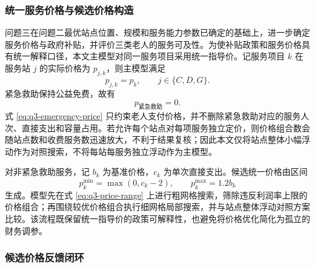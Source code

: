 \subsubsection{统一服务价格与候选价格构造}

问题三在问题二最优站点位置、规模和服务能力参数已确定的基础上，进一步确定服务价格与政府补贴，并评价三类老人的服务可及性。为使补贴政策和服务价格具有统一解释口径，本文主模型对同一服务项目采用统一指导价。记服务项目 $k$ 在服务站 $j$ 的实际价格为 $p_{j,k}$，则主模型满足
\begin{equation}
  p_{j,k}=p_k,
  \qquad j\in\{C,D,G\}.
  \label{eq:q3-uniform-price}
\end{equation}
紧急救助保持公益免费，故有
\begin{equation}
  p_{\text{紧急救助}}=0.
  \label{eq:q3-emergency-price}
\end{equation}
式 \eqref{eq:q3-emergency-price} 只约束老人支付价格，并不删除紧急救助对应的服务人次、直接支出和容量占用。若允许每个站点对每项服务独立定价，则价格组合数会随站点数和收费服务数迅速放大，不利于结果复核；因此本文仅将站点整体小幅浮动作为对照搜索，不将每站每服务独立浮动作为主模型。

对非紧急救助服务，记 $b_k$ 为基准价格，$c_k$ 为单次直接支出。候选统一价格由区间
\begin{equation}
  p_k^{\min}=\max(0,c_k-2),
  \qquad
  p_k^{\max}=1.2b_k
  \label{eq:q3-price-range}
\end{equation}
生成。模型先在式 \eqref{eq:q3-price-range} 上进行粗网格搜索，筛除违反利润率上限的价格组合；再围绕较优价格组合执行细网格局部搜索，并与站点整体浮动对照方案比较。该流程既保留统一指导价的政策可解释性，也避免将价格优化简化为孤立的财务调参。

\subsubsection{候选价格反馈闭环}

